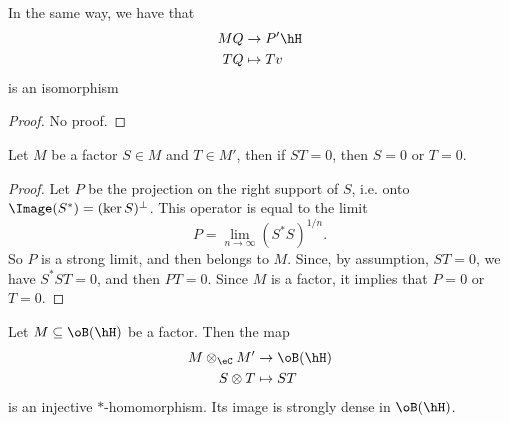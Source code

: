 \begin{proposition}
	In the same way, we have that
	\begin{equation}
		\begin{aligned}
			MQ & \to P'\hH  \\
			TQ & \mapsto Tv
		\end{aligned}
	\end{equation}
	is an isomorphism
\end{proposition}

\begin{proof}
	No proof.
\end{proof}

\begin{proposition}
	Let $M$ be a factor $S\in M$ and $T\in M'$, then if $ST=0$, then $S=0$ or $T=0$.
\end{proposition}

\begin{proof}
	Let $P$ be the projection on the right support of $S$, i.e. onto $\Image(S^*)=(\ker S)^{\perp}$. This operator is equal to the limit
	\[
		P=\lim_{n\to\infty}(S^*S)^{1/n}.
	\]
	So $P$ is a strong limit, and then belongs to $M$. Since, by assumption, $ST=0$, we have $S^*ST=0$, and then $PT=0$. Since $M$ is a factor, it implies that $P=0$ or $T=0$.
\end{proof}

\begin{proposition}
	Let $M\subseteq\oB(\hH)$ be a factor. Then the map
	\begin{equation}
		\begin{aligned}
			M\otimes_{\eC}M' & \to \oB(\hH) \\
			S\otimes T       & \mapsto ST
		\end{aligned}
	\end{equation}
	is an injective $*$-homomorphism. Its image is strongly dense in $\oB(\hH)$.
\end{proposition}

